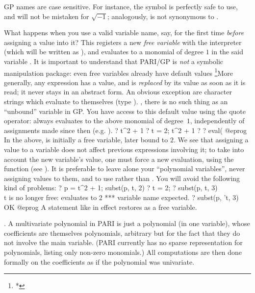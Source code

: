 GP names are case sensitive. For instance, the symbol  is perfectly
safe to use, and will not be mistaken for $\sqrt{-1}$; analogously, 
is not synonymous to .

What happens when you use a valid variable name, say, for the first
time \emph{before} assigning a value into it? This registers a new
\emph{free variable} with the interpreter (which will be written as ),
and evaluates to a monomial of degree $1$ in the said variable . It is
important to understand that PARI/GP is \emph{not} a symbolic manipulation
package: even free variables already have default values%
\footnote{*}{More generally, any expression has a value, and is
\emph{replaced} by its value as soon as it is read; it never stays in an
abstract form. An obvious exception are character strings which evaluate
to themselves (type ).}%
, there is no such thing as an ``unbound'' variable in GP.
You have access to this default value using the quote operator: 
always evaluates to the above monomial of degree~$1$, independently of
assignments made since then (e.g. ).
%
\bprog
  ? t^2 + 1
  ? t = 2; t^2 + 1
  ? %
  ? eval(%
@eprog\noindent
In the above,  is initially a free variable, later bound to $2$. We
see that assigning a value to a variable does not affect previous expressions
involving it; to take into account the new variable's value, one must force a
new evaluation, using the function  (see ). It is
preferable to leave alone your ``polynomial variables'', never assigning
values to them, and to use  rather than . You will avoid
the following kind of problems:
\bprog
  ? p = t^2 + 1; subst(p, t, 2)
  ? t = 2;
  ? subst(p, t, 3)    \\ t is no longer free: evaluates to 2
    ***   variable name expected.
  ? subst(p, 't, 3)   \\ OK
@eprog\noindent
A statement like  in effect restores  as a free variable.

.\label{se:priority}
A multivariate polynomial in PARI is just a polynomial (in one variable),
whose coefficients are themselves polynomials, arbitrary but for the fact
that they do not involve the main variable. (PARI currently has no sparse
representation for polynomials, listing only non-zero monomials.) All
computations are then done formally on the coefficients as if the
polynomial was univariate.

